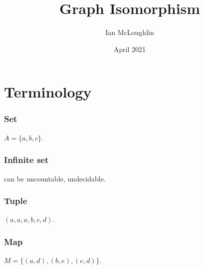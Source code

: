 \documentclass[a4paper]{IEEEtran}
\title{Graph Isomorphism}
\author{Ian McLoughlin}
\date{April 2021}
\begin{document}
\maketitle

\section{Terminology}
    \vspace{2mm}
    \subsubsection{Set} $A = \{a, b, c\}$.
    \vspace{2mm}
    \subsubsection{Infinite set} can be uncountable, undecidable.
    \vspace{2mm}
    \subsubsection{Tuple} $(a,a,a,b,c,d)$.
    \vspace{2mm}
    \subsubsection{Map} $M = \{(a,d),(b,e),(c,d)\}$.
    \vspace{4mm}
\end{document}
